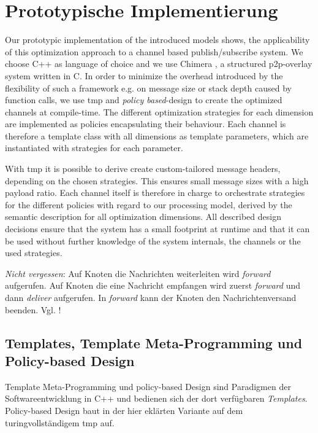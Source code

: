 \chapter{Prototypische Implementierung}
\label{chap:impl}

Our prototypic implementation of the introduced models shows, the applicability of this optimization approach to a channel based publish/subscribe system. We choose C++ as language of choice and we use Chimera \cite{Allen2006Chimera}, a structured p2p-overlay system written in C. In order to minimize the overhead introduced by the flexibility of such a framework e.g. on message size or stack depth caused by function calls, we use \ac{tmp} and \emph{policy based}-design \cite{Alexandrescu2001Modern} to create the optimized channels at compile-time. The different optimization strategies for each dimension are implemented as policies encapsulating their behaviour. Each channel is therefore a template class with all dimensions as template parameters, which are instantiated with strategies for each parameter.  

With \ac{tmp} it is possible to derive create custom-tailored message headers, depending on the chosen strategies. This ensures small message sizes with a high payload ratio. Each channel itself is therefore in charge to orchestrate strategies for the different policies with regard to our processing model, derived by the semantic description for all optimization dimensions. All described design decisions ensure that the system has a small footprint at runtime and that it can be used without further knowledge of the system internals, the channels or the used strategies.

\emph{Nicht vergessen}: Auf Knoten die Nachrichten weiterleiten wird \emph{forward} aufgerufen. Auf Knoten die eine Nachricht empfangen wird zuerst \emph{forward} und dann \emph{deliver} aufgerufen. In \emph{forward} kann der Knoten den Nachrichtenversand beenden. Vgl. !

\section{Templates, Template Meta-Programming und Policy-based Design}
Template Meta-Programming und policy-based Design \cite{Alexandrescu2001Modern} sind Paradigmen der Softwareentwicklung in C++ und bedienen sich der dort verfügbaren \emph{Templates}. Policy-based Design baut in der hier eklärten Variante auf dem turingvollständigem \ac{tmp} auf.

